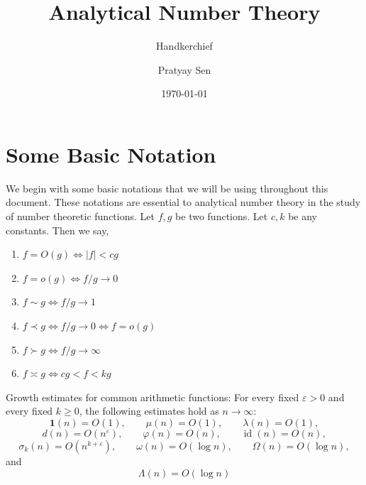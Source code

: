 \documentclass[a4paper,11pt,abstracton]{scrartcl}
\theoremstyle{dotlessP}
\theoremstyle{dotlessS}
\theoremstyle{remark}
\theoremstyle{definition}
\begin{document}

\title{Analytical Number Theory}
\subtitle{Handkerchief}
\author{Pratyay Sen}
\date{\today}
\maketitle

\tableofcontents

\eject



\section{Some Basic Notation}
We begin with some basic notations that we will be using throughout this document. These notations are essential to analytical number theory in the study of number theoretic functions.
Let $f,g$ be two functions. Let $c, k$ be any constants. Then we say,
\begin{enumerate}
\item $f=O(g) \iff |f|<cg$
\item $f=o(g) \iff f/g \rightarrow 0$
\item $f \sim g \iff f/g \rightarrow 1$
\item $f \prec g \iff f/g \rightarrow 0 \iff f=o(g)$
\item $f \succ g \iff f/g \rightarrow \infty$
\item $f \asymp g \iff cg < f < kg$
\end{enumerate}

\begin{mainbox}{Growth estimates for common arithmetic functions:}
For every fixed $\varepsilon>0$ and every fixed $k\geq0$, the
following estimates hold as $n\to\infty$:
\[
    \mathbf{1}(n)=O(1),
    \qquad
    \mu(n)=O(1),
    \qquad
    \lambda(n)=O(1),
\]
\[
    d(n)=O(n^{\varepsilon}),
    \qquad
    \varphi(n)=O(n),
    \qquad
    \operatorname{id}(n)=O(n),
\]
\[
    \sigma_k(n)=O(n^{k+\varepsilon}),
    \qquad
    \omega(n)=O(\log n),
    \qquad
    \Omega(n)=O(\log n),
\]
and
\[
    \Lambda(n)=O(\log n)
\]
\end{mainbox}
\end{document}

